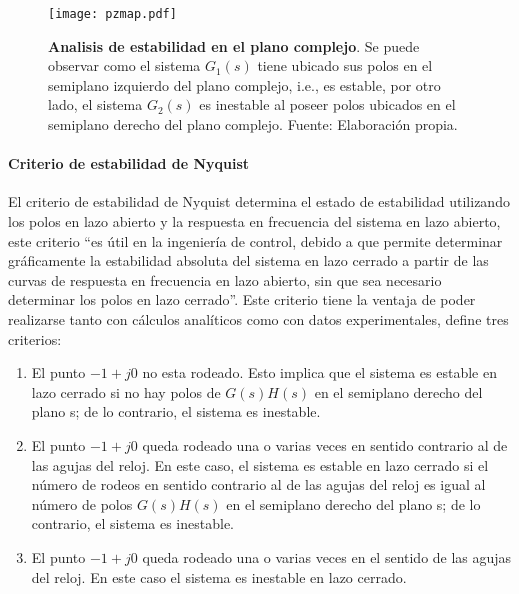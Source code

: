                 \begin{figure}[htb]
                    \centering
                    \texttt{[image: pzmap.pdf]}
                    \caption[Ejemplo de analisis de estabilidad en el plano complejo]{\textbf{Analisis de estabilidad en el plano complejo}. Se puede observar como el sistema $G_1(s)$ tiene ubicado sus polos en el semiplano izquierdo del plano complejo, i.e., es estable, por otro lado, el sistema $G_2(s)$ es inestable al poseer polos ubicados en el semiplano derecho del plano complejo. Fuente: Elaboración propia.} 
                    \label{fig:pzmap}
                \end{figure}
            
            \paragraph{Criterio de estabilidad de Nyquist}
                
                El criterio de estabilidad de Nyquist determina el estado de estabilidad utilizando los polos en lazo abierto y la respuesta en frecuencia del sistema en lazo abierto, este criterio \enquote{es útil en la ingeniería de control, debido a que permite determinar gráficamente la estabilidad absoluta del sistema en lazo cerrado a partir de las curvas de respuesta en frecuencia en lazo abierto, sin que sea necesario determinar los polos en lazo cerrado}\Parencite[p.$\,$446]{ogata2003ingenieria}. Este criterio tiene la ventaja de poder realizarse tanto con cálculos analíticos como con datos experimentales, \textcite{ogata2003ingenieria} define tres criterios:

                \begin{enumerate}[leftmargin=\parindent]
                    \item El punto $-1 + j0$ no esta rodeado. Esto implica que el sistema es estable en lazo cerrado si no hay polos de $G(s)H(s)$ en el semiplano derecho del plano s; de lo contrario, el sistema es inestable.
                    \item El punto $-1 + j0$ queda rodeado una o varias veces en sentido contrario al de las agujas
                    del reloj. En este caso, el sistema es estable en lazo cerrado si el número de rodeos en sentido contrario
                    al de las agujas del reloj es igual al número de polos $G(s)H(s)$ en el semiplano derecho
                    del plano s; de lo contrario, el sistema es inestable.


                    \item El punto $-1 + j0$ queda rodeado una o varias veces en el sentido de las agujas del reloj.
                    En este caso el sistema es inestable en lazo cerrado.
                \end{enumerate}
                

